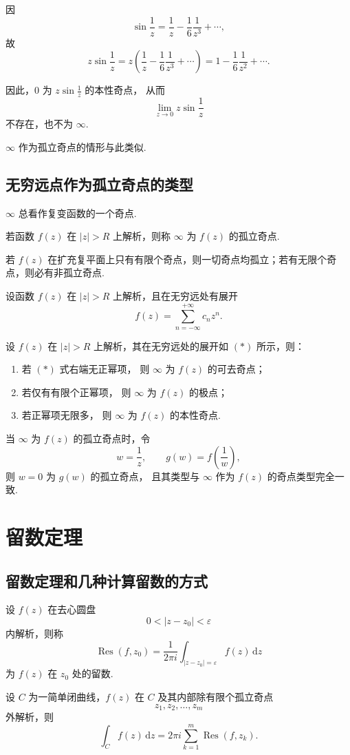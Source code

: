 \documentclass[openany,oneside]{ctexbook}
\begin{document}
\begin{solution}
因
\[
\sin\frac{1}{z}
= \frac{1}{z}-\frac{1}{6}\frac{1}{z^3}+\cdots,
\]
故
\[
z\sin\frac{1}{z}
= z\left(\frac{1}{z}-\frac{1}{6}\frac{1}{z^3}+\cdots\right)
= 1-\frac{1}{6}\frac{1}{z^2}+\cdots.
\]

因此，$0$ 为 $z\sin\frac{1}{z}$ 的本性奇点，
从而
\[
\lim_{z\to 0} z\sin\frac{1}{z}
\]
不存在，也不为 $\infty$.

$\infty$ 作为孤立奇点的情形与此类似.
\end{solution}

\subsection{无穷远点作为孤立奇点的类型}
$\infty$ 总看作复变函数的一个奇点.
\begin{definition}
若函数 $f(z)$ 在 $|z|>R$ 上解析，则称 $\infty$ 为 $f(z)$ 的孤立奇点.
\end{definition}
\begin{remark}
若 $f(z)$ 在扩充复平面上只有有限个奇点，则一切奇点均孤立；若有无限个奇点，则必有非孤立奇点.
\end{remark}
\begin{definition}
设函数 $f(z)$ 在 $|z|>R$ 上解析，且在无穷远处有展开
\[
f(z)=\sum_{n=-\infty}^{+\infty} c_n z^n. \tag{$*$}
\]

设 $f(z)$ 在 $|z|>R$ 上解析，其在无穷远处的展开如 $(*)$ 所示，则：
\begin{enumerate}
  \item 若 $(*)$ 式右端无正幂项，
  则 $\infty$ 为 $f(z)$ 的可去奇点；

  \item 若仅有有限个正幂项，
  则 $\infty$ 为 $f(z)$ 的极点；

  \item 若正幂项无限多，
  则 $\infty$ 为 $f(z)$ 的本性奇点.
\end{enumerate}
\end{definition}
当 $\infty$ 为 $f(z)$ 的孤立奇点时，令
\[
w=\frac{1}{z}, \qquad g(w)=f\!\left(\frac{1}{w}\right),
\]
则 $w=0$ 为 $g(w)$ 的孤立奇点，
且其类型与 $\infty$ 作为 $f(z)$ 的奇点类型完全一致.


\section{留数定理}
\subsection{留数定理和几种计算留数的方式}
\begin{definition}
设 $f(z)$ 在去心圆盘
\[
0<|z-z_0|<\varepsilon
\]
内解析，则称
\[
\operatorname{Res}(f,z_0)
=\frac{1}{2\pi i}\int_{|z-z_0|=\varepsilon} f(z)\,\mathrm{d}z
\]
为 $f(z)$ 在 $z_0$ 处的留数.
\end{definition}
\begin{theorem}[留数定理]
设 $C$ 为一简单闭曲线，$f(z)$ 在 $C$ 及其内部除有限个孤立奇点
\[
z_1,z_2,\dots,z_m
\]
外解析，则
\[
\int_C f(z)\,\mathrm{d}z
=2\pi i \sum_{k=1}^{m} \operatorname{Res}(f,z_k).
\]
\end{theorem}
\end{document}
